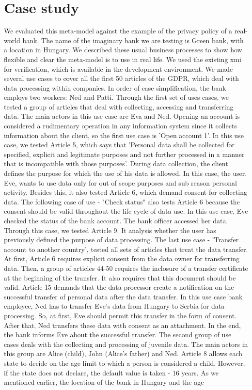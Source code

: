 \documentclass[11pt,english]{article}
\begin{document}
\section{Case study}
We evaluated this meta-model against the example of the privacy policy of a real-world bank. The name of the imaginary bank we are testing is Green bank, with a location in Hungary. We described these usual business processes to show how flexible and clear the meta-model is to use in real life. We used the existing xmi for verification, which is available in the development environment. We made several use cases to cover all the first 50 articles of the GDPR, which deal with data processing within companies. In order of case simplification, the bank employs two workers: Ned and Patti. \newline Through the first set of uses cases, we tested a group of articles that deal with collecting, accessing and transferring data. The main actors in this use case are Eva and Ned. Opening an account is considered a rudimentary operation in any information system since it collects information about the client, so the first use case is 'Open account 1'. In this use case, we tested Article 5, which says that 'Personal data shall be collected for specified, explicit and legitimate purposes and not further processed in a manner that is incompatible with those purposes'. During data collection, the client defines the purpose for which the use of his data is allowed. In this case, the user, Eve, wants to use data only for out of scope purposes and sub reason personal activity. Besides this, it also tested Article 6, which demand consent for collecting data. The following case of use - "Check status" also tests Article 6 because the consent should be valid throughout the life cycle of data use. In this use case, Eve checked the status of the bank account. The bank officer accessed her data. Through this case, we tested Article 9. It analysis whether the user has previously defined the purpose of data processing. The last use case - 'Transfer account to another country', tested all sets of articles that treat the data transfer. At first, Article 6 requires explicit consent from the data owner for transferring data. Then, a group of articles 44-50 requires the inclosure of a transfer certificate at the beginning of the transfer. It also requires that this document should be valid. Article 15 demands that the data processor create a notification on the successful transfer of personal data after the data transfer. In this use case bank employee, Ned has to transfer Eve's data from Hungary to Serbia for data processing. So, at first, Eve should permit this transfer in the form of consent. After that, Ned transfers these data with consent as an attachment. In the end, the bank informs Eve about the successful transfer. \newline The second group of use cases deals with the collecting and processing of juvenile data. The main actors in this group are Alice (child), John (Alice's father) and Ned. Article 8 allows each state to decide on the age limit to which a person is considered a child. However, if the state does not declare, the default value is taken - 16 years. As we mentioned earlier, the location of the bank in Hungary and the age 
\end{document}
